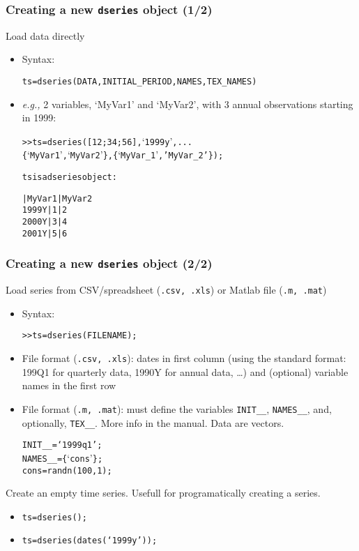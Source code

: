 \documentclass[10pt]{beamer}
\newcommand{\myitem}{\item[$\bullet$]}
\begin{document}
\begin{frame}[fragile,t]
  \frametitle{Creating a new \texttt{dseries} object (1/2)}
  Load data directly
  \begin{itemize}
    \myitem Syntax:
    \begin{alltt}
  ts = dseries(DATA, INITIAL_PERIOD, NAMES, TEX_NAMES)
    \end{alltt}
    \myitem \textit{e.g.,} 2 variables, `MyVar1' and `MyVar2', with
    3 annual observations starting in 1999:
\small{
    \begin{alltt}
  >> ts = dseries([1 2;3 4;5 6], `1999y', ...
                 \{`MyVar1', `MyVar2'\}, \{`MyVar\_1', 'MyVar\_2'\});

  ts is a dseries object:

        | MyVar1 | MyVar2
  1999Y | 1      | 2
  2000Y | 3      | 4
  2001Y | 5      | 6
    \end{alltt}}
  \end{itemize}
\end{frame}

\begin{frame}[fragile,t]
  \frametitle{Creating a new \texttt{dseries} object (2/2)}
  Load series from CSV/spreadsheet (\texttt{.csv, .xls}) or Matlab file (\texttt{.m, .mat})
  \begin{itemize}
    \myitem Syntax:
    \begin{alltt}
  >> ts = dseries(FILENAME);
    \end{alltt}
    \myitem File format (\texttt{.csv, .xls}): dates in first column (using the standard format:
    199Q1 for quarterly data, 1990Y for annual data, \dots) and (optional)
    variable names in the first row
    \myitem File format (\texttt{.m, .mat}): must define the variables \texttt{INIT\_\_},
    \texttt{NAMES\_\_}, and, optionally, \texttt{TEX\_\_}. More info in the
    manual. Data are vectors.
    \begin{alltt}
      INIT__ = `1999q1’;
      NAMES__ = \{`cons'\};
      cons = randn(100,1);
    \end{alltt}
  \end{itemize}
  Create an empty time series. Usefull for programatically creating a series.
  \begin{itemize}
    \myitem \texttt{ts=dseries();}
    \myitem \texttt{ts=dseries(dates(`1999y'));}
  \end{itemize}
\end{frame}
\end{document}
